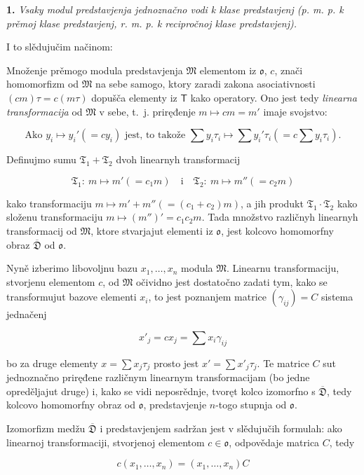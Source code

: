 \documentclass[11pt]{article}
\begin{document}
\textbf{1.} \emph{Vsaky modul predstavjenja jednoznačno vodi k klase predstavjenj (p. m. p. k prěmoj klase predstavjenj, r. m. p. k recipročnoj klase predstavjenj).}

I to slědujučim načinom:

Množenje prěmogo modula predstavjenja \(\mathfrak M\) elementom iz \(\mathfrak{o}\), \(c\), znači homomorfizm od \(\mathfrak M\) na sebe samogo, ktory zaradi zakona asociativnosti \((cm)\tau=c(m\tau)\) dopušča elementy iz \(\mathsf T\) kako operatory. Ono jest tedy \emph{linearna transformacija} od \(\mathfrak M\) v sebe, t.~j. priręđenje \(m\mapsto cm=m'\) imaje svojstvo:

\[
\text{Ako } y_i\mapsto y_i'(=cy_i) \text{ jest, to takože }
\sum y_i\tau_i\mapsto \sum y_i'\tau_i\left(=c\sum y_i\tau_i\right).
\]

Definujmo sumu \(\mathfrak T_1+\mathfrak T_2\) dvoh linearnyh transformacij

\[
\mathfrak T_1:\ m\mapsto m'(=c_1m)
\quad\text{i}\quad
\mathfrak T_2:\ m\mapsto m''(=c_2m)
\]

kako transformaciju \(m\mapsto m'+m''(=(c_1+c_2)m)\), a jih produkt \(\mathfrak T_1\cdot\mathfrak T_2\) kako složenu transformaciju \(m\mapsto (m'')'=c_1c_2m\). Tada množstvo različnyh linearnyh transformacij od \(\mathfrak M\), ktore stvarjajut elementi iz \(\mathfrak{o}\), jest kolcovo homomorfny obraz \(\overline{\mathfrak D}\) od \(\mathfrak{o}\).

Nyně izberimo libovoljnu bazu \(x_1,\ldots,x_n\) modula \(\mathfrak M\). Linearnu transformaciju, stvorjenu elementom \(c\), od \(\mathfrak M\) očividno jest dostatočno zadati tym, kako se transformujut bazove elementi \(x_i\), to jest poznanjem matrice \((\gamma_{ij})=C\) sistema jednačenj

\[
x'_j=cx_j=\sum x_i\gamma_{ij}
\]

bo za druge elementy \(x=\sum x_j\tau_j\) prosto jest \(x'=\sum x'_j\tau_j\). Te matrice \(C\) sut jednoznačno priręđene različnym linearnym transformacijam (bo jedne opreděljajut druge) i, kako se vidi neposrědnje, tvoręt kolco izomorfno s \(\overline{\mathfrak D}\), tedy kolcovo homomorfny obraz od \(\mathfrak{o}\), predstavjenje \(n\)-togo stupnja od \(\mathfrak{o}\).

Izomorfizm medžu \(\overline{\mathfrak D}\) i predstavjenjem sadržan jest v slědujučih formulah: ako linearnoj transformaciji, stvorjenoj elementom \(c\in\mathfrak{o}\), odpovědaje matrica \(C\), tedy

\[
c(x_1,\ldots,x_n)=(x_1,\ldots,x_n)C
\]
\end{document}
